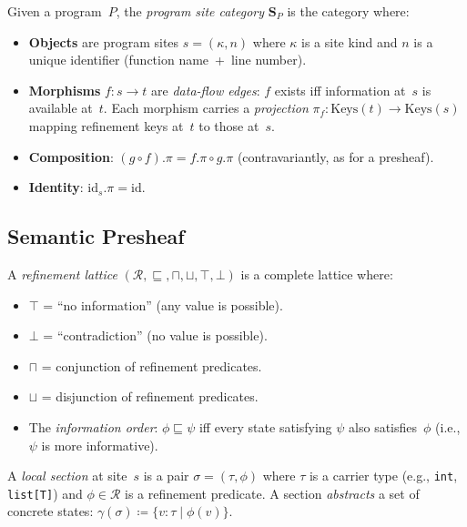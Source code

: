 \documentclass[acmsmall,screen]{acmart}
\theoremstyle{remark}
\newcommand{\defeq}{\coloneqq}
\begin{document}
\begin{definition}\label{def:site-cat}
Given a program~$P$, the \emph{program site category} $\mathbf{S}_P$ is
the category where:
\begin{itemize}[nosep]
  \item \textbf{Objects} are program sites $s = (\kappa, n)$ where
    $\kappa$ is a site kind and $n$ is a unique identifier (function
    name~+~line number).
  \item \textbf{Morphisms} $f : s \to t$ are \emph{data-flow edges}:
    $f$ exists iff information at~$s$ is available at~$t$.  Each
    morphism carries a \emph{projection} $\pi_f : \mathrm{Keys}(t) \to
    \mathrm{Keys}(s)$ mapping refinement keys at~$t$ to those at~$s$.
  \item \textbf{Composition}: $(g \circ f).\pi = f.\pi \circ g.\pi$
    (contravariantly, as for a presheaf).
  \item \textbf{Identity}: $\mathrm{id}_s.\pi = \mathrm{id}$.
\end{itemize}
\end{definition}

\subsection{Semantic Presheaf}\label{sec:presheaf}

\begin{definition}\label{def:ref-lattice}
A \emph{refinement lattice} $(\mathcal{R}, \sqsubseteq, \sqcap,
\sqcup, \top, \bot)$ is a complete lattice where:
\begin{itemize}[nosep]
  \item $\top$ = ``no information'' (any value is possible).
  \item $\bot$ = ``contradiction'' (no value is possible).
  \item $\sqcap$ = conjunction of refinement predicates.
  \item $\sqcup$ = disjunction of refinement predicates.
  \item The \emph{information order}: $\phi \sqsubseteq \psi$ iff
    every state satisfying $\psi$ also satisfies~$\phi$ (i.e.,
    $\psi$ is more informative).
\end{itemize}
\end{definition}

\begin{definition}\label{def:local-section}
A \emph{local section} at site~$s$ is a pair
$\sigma = (\tau, \phi)$ where $\tau$ is a carrier type
(e.g., \texttt{int}, \texttt{list[T]}) and $\phi \in \mathcal{R}$
is a refinement predicate.  A section \emph{abstracts} a set of
concrete states: $\gamma(\sigma) \defeq \{ v : \tau \mid \phi(v) \}$.
\end{definition}
\end{document}

